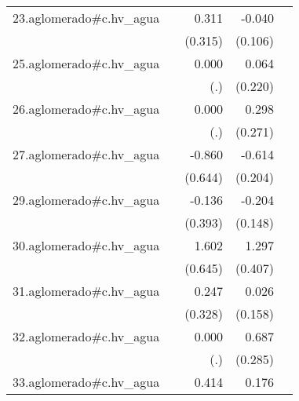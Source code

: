 {\begin{longtable}{l*{4}{D{.}{.}{-1}}}
\addlinespace
23.aglomerado#c.hv\_agua&                     &       0.311         &      -0.040         &                     \\
            &                     &     (0.315)         &     (0.106)         &                     \\
\addlinespace
25.aglomerado#c.hv\_agua&                     &       0.000         &       0.064         &                     \\
            &                     &         (.)         &     (0.220)         &                     \\
\addlinespace
26.aglomerado#c.hv\_agua&                     &       0.000         &       0.298         &                     \\
            &                     &         (.)         &     (0.271)         &                     \\
\addlinespace
27.aglomerado#c.hv\_agua&                     &      -0.860         &      -0.614\sym{**} &                     \\
            &                     &     (0.644)         &     (0.204)         &                     \\
\addlinespace
29.aglomerado#c.hv\_agua&                     &      -0.136         &      -0.204         &                     \\
            &                     &     (0.393)         &     (0.148)         &                     \\
\addlinespace
30.aglomerado#c.hv\_agua&                     &       1.602\sym{*}  &       1.297\sym{**} &                     \\
            &                     &     (0.645)         &     (0.407)         &                     \\
\addlinespace
31.aglomerado#c.hv\_agua&                     &       0.247         &       0.026         &                     \\
            &                     &     (0.328)         &     (0.158)         &                     \\
\addlinespace
32.aglomerado#c.hv\_agua&                     &       0.000         &       0.687\sym{*}  &                     \\
            &                     &         (.)         &     (0.285)         &                     \\
\addlinespace
33.aglomerado#c.hv\_agua&                     &       0.414         &       0.176\sym{**} &                     \\

\end{longtable}}
